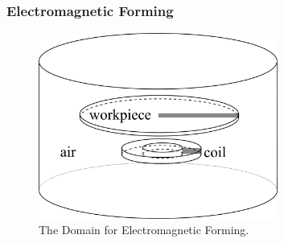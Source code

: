 \documentclass[notheorems,serif]{beamer}
\begin{document}
\begin{CJK}{UTF8}{gkai}
\begin{frame}
    \frametitle{Electromagnetic Forming}
\begin{figure}[htpb]
    \centering
    \includegraphics[width=0.7\textwidth]{../figures/movingmaxwell/EMF.pdf}
    \caption{The Domain for Electromagnetic Forming.}
\end{figure}
\end{frame}


\end{CJK}
\end{document}
